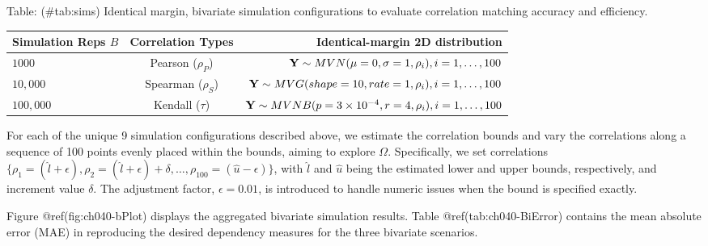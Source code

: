 \documentclass[
]{jss}
\begin{document}
Table: (\#tab:sims) Identical margin, bivariate simulation
configurations to evaluate correlation matching accuracy and efficiency.

\begin{table}[]
\begin{tabular}{@{}lcr@{}}
\toprule
Simulation Reps $B$ & Correlation Types & Identical-margin 2D distribution \\ \midrule
$1000$ & Pearson ($\rho_P$) & ${\bf Y} \sim MVN( \mu= 0 , \sigma = 1, \rho_i ), i=1,\ldots,100$ \\
$10,000$ & Spearman ($\rho_S$) & ${\bf Y} \sim MVG( shape = 10, rate = 1, \rho_i ), i=1,\ldots,100$ \\
$100,000$ & Kendall ($\tau$) & ${\bf Y} \sim MVNB(p = 3\times10^{-4}, r = 4,\rho_i), i=1,\ldots,100$ \\ \bottomrule
\end{tabular}
\end{table}

For each of the unique 9 simulation configurations described above, we
estimate the correlation bounds and vary the correlations along a
sequence of 100 points evenly placed within the bounds, aiming to
explore \(\Omega\). Specifically, we set correlations
\(\{ \rho_1 = ( \hat{l} + \epsilon), \rho_2 = (\hat{l} + \epsilon) + \delta, \ldots, \rho_{100} = (\hat{u} - \epsilon) \}\),
with \(\hat{l}\) and \(\hat{u}\) being the estimated lower and upper
bounds, respectively, and increment value \(\delta\). The adjustment
factor, \(\epsilon=0.01\), is introduced to handle numeric issues when
the bound is specified exactly.

Figure @ref(fig:ch040-bPlot) displays the aggregated bivariate
simulation results. Table @ref(tab:ch040-BiError) contains the mean
absolute error (MAE) in reproducing the desired dependency measures for
the three bivariate scenarios.
\end{document}

